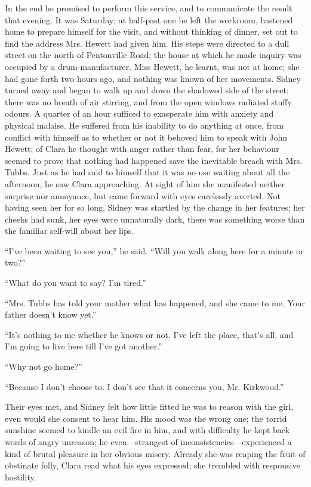 In the end he promised to perform this {}service, and to communicate the
result that evening. It was Saturday; at half-past one he left the
workroom, hastened home to prepare himself for the visit, and without
thinking of dinner, set out to find the address Mrs. Hewett had given
him. His steps were directed to a dull street on the north of
Pentonville Road; the house at which he made inquiry was occupied by a
drum-manufacturer. Miss Hewett, he learnt, was not at home; she had gone
forth two hours ago, and nothing was known of her movements. Sidney
turned away and began to walk up and down the shadowed side of the
street; there was no breath of air stirring, and from the open windows
radiated stuffy odours. A quarter of an hour sufficed to exasperate him
with anxiety and physical malaise. He suffered from his inability to do
anything at once, from conflict with himself as to whether or not it
behoved him to speak with John Hewett; of Clara he thought with anger
rather than fear, for her behaviour seemed to prove that nothing had
happened save the {}inevitable breach with Mrs. Tubbs. Just as he had
said to himself that it was no use waiting about all the afternoon, he
saw Clara approaching. At sight of him she manifested neither surprise
nor annoyance, but came forward with eyes carelessly averted. Not having
seen her for so long, Sidney was startled by the change in her features;
her cheeks had sunk, her eyes were unnaturally dark, there was something
worse than the familiar self-will about her lips.

``I've been waiting to see you,'' he said. ``Will you walk along here
for a minute or two?''

``What do you want to say? I'm tired.''

``Mrs. Tubbs has told your mother what has happened, and she came to me.
Your father doesn't know yet.''

``It's nothing to me whether he knows or not. I've left the place,
that's all, and I'm going to live here till I've got another.''

``Why not go home?''

``Because I don't choose to. I don't see that it concerns you, Mr.
Kirkwood.''

{}Their eyes met, and Sidney felt how little fitted he was to reason
with the girl, even would she consent to hear him. His mood was the
wrong one; the torrid sunshine seemed to kindle an evil fire in him, and
with difficulty he kept back words of angry unreason; he
even---strangest of inconsistencies---experienced a kind of brutal
pleasure in her obvious misery. Already she was reaping the fruit of
obstinate folly, Clara read what his eyes expressed; she trembled with
responsive hostility.

